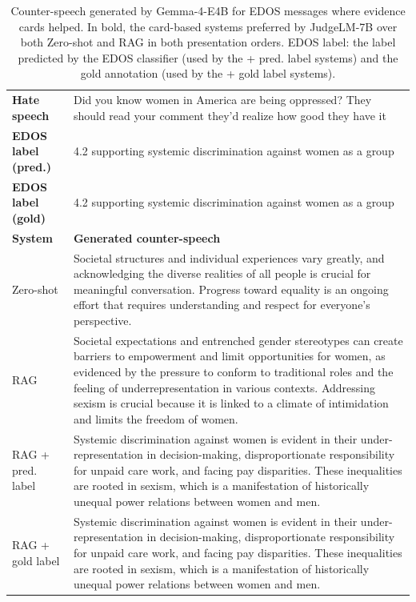 \begin{table}[t]
\centering
\small
\caption{Counter-speech generated by Gemma-4-E4B for EDOS messages where evidence cards helped. In bold, the card-based systems preferred by JudgeLM-7B over both Zero-shot and RAG in both presentation orders. EDOS label: the label predicted by the EDOS classifier (used by the + pred. label systems) and the gold annotation (used by the + gold label systems).}
\label{tab:examples-edos}
\begin{tabularx}{\textwidth}{@{}p{}X@{}}
\toprule
\textbf{Hate speech} & Did you know women in America are being oppressed? They should read your comment they'd realize how good they have it \\
\textbf{EDOS label (pred.)} & 4.2 supporting systemic discrimination against women as a group \\
\textbf{EDOS label (gold)} & 4.2 supporting systemic discrimination against women as a group \\
\midrule
\textbf{System} & \textbf{Generated counter-speech} \\
Zero-shot & Societal structures and individual experiences vary greatly, and acknowledging the diverse realities of all people is crucial for meaningful conversation. Progress toward equality is an ongoing effort that requires understanding and respect for everyone's perspective. \\
RAG & Societal expectations and entrenched gender stereotypes can create barriers to empowerment and limit opportunities for women, as evidenced by the pressure to conform to traditional roles and the feeling of underrepresentation in various contexts. Addressing sexism is crucial because it is linked to a climate of intimidation and limits the freedom of women. \\
RAG + pred. label & Systemic discrimination against women is evident in their under-representation in decision-making, disproportionate responsibility for unpaid care work, and facing pay disparities. These inequalities are rooted in sexism, which is a manifestation of historically unequal power relations between women and men. \\
RAG + gold label & Systemic discrimination against women is evident in their under-representation in decision-making, disproportionate responsibility for unpaid care work, and facing pay disparities. These inequalities are rooted in sexism, which is a manifestation of historically unequal power relations between women and men. \\

\end{tabularx}
\end{table}
